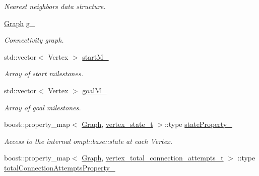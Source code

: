 \begin{DoxyCompactItemize}
\begin{DoxyCompactList}\small\item\em \-Nearest neighbors data structure. \end{DoxyCompactList}\item 
\hypertarget{class_f_i_r_m_ac954812b235fc64b57ea319bec7c80bb}{\hyperlink{class_f_i_r_m_a687e9f4243b22c30ee1fa5da22a85053}{\-Graph} \hyperlink{class_f_i_r_m_ac954812b235fc64b57ea319bec7c80bb}{g\-\_\-}}\label{class_f_i_r_m_ac954812b235fc64b57ea319bec7c80bb}

\begin{DoxyCompactList}\small\item\em \-Connectivity graph. \end{DoxyCompactList}\item 
\hypertarget{class_f_i_r_m_a333c7dec34b4c0977f85424b9fc3dc21}{std\-::vector$<$ \-Vertex $>$ \hyperlink{class_f_i_r_m_a333c7dec34b4c0977f85424b9fc3dc21}{start\-M\-\_\-}}\label{class_f_i_r_m_a333c7dec34b4c0977f85424b9fc3dc21}

\begin{DoxyCompactList}\small\item\em \-Array of start milestones. \end{DoxyCompactList}\item 
\hypertarget{class_f_i_r_m_aeb59b6121e120e14f30c58e567ec6a4c}{std\-::vector$<$ \-Vertex $>$ \hyperlink{class_f_i_r_m_aeb59b6121e120e14f30c58e567ec6a4c}{goal\-M\-\_\-}}\label{class_f_i_r_m_aeb59b6121e120e14f30c58e567ec6a4c}

\begin{DoxyCompactList}\small\item\em \-Array of goal milestones. \end{DoxyCompactList}\item 
\hypertarget{class_f_i_r_m_a8f27981600a6b5ee4c5124b8f9bc640b}{boost\-::property\-\_\-map$<$ \hyperlink{class_f_i_r_m_a687e9f4243b22c30ee1fa5da22a85053}{\-Graph}, \*
\hyperlink{struct_f_i_r_m_1_1vertex__state__t}{vertex\-\_\-state\-\_\-t} $>$\-::type \hyperlink{class_f_i_r_m_a8f27981600a6b5ee4c5124b8f9bc640b}{state\-Property\-\_\-}}\label{class_f_i_r_m_a8f27981600a6b5ee4c5124b8f9bc640b}

\begin{DoxyCompactList}\small\item\em \-Access to the internal ompl\-::base\-::state at each \-Vertex. \end{DoxyCompactList}\item 
\hypertarget{class_f_i_r_m_a5651af4be68cf84115fbf6fe4b2c958d}{boost\-::property\-\_\-map$<$ \hyperlink{class_f_i_r_m_a687e9f4243b22c30ee1fa5da22a85053}{\-Graph}, \*
\hyperlink{struct_f_i_r_m_1_1vertex__total__connection__attempts__t}{vertex\-\_\-total\-\_\-connection\-\_\-attempts\-\_\-t} $>$\*
\-::type \hyperlink{class_f_i_r_m_a5651af4be68cf84115fbf6fe4b2c958d}{total\-Connection\-Attempts\-Property\-\_\-}}\label{class_f_i_r_m_a5651af4be68cf84115fbf6fe4b2c958d}


\end{DoxyCompactItemize}

